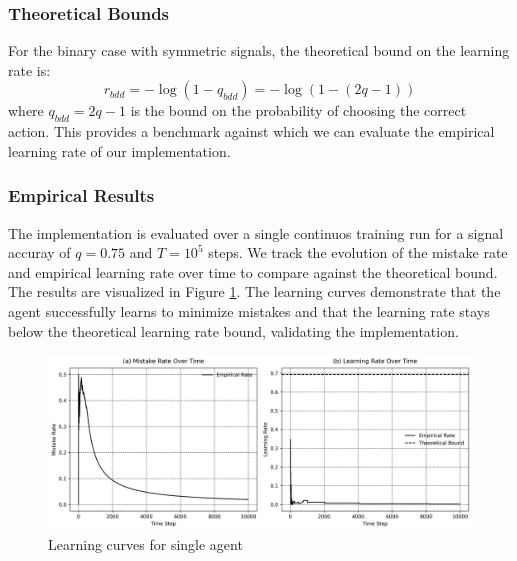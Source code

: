 \subsubsection*{Theoretical Bounds}
For the binary case with symmetric signals, the theoretical bound on the learning rate is:
\[
    r_{bdd} = -\log(1-q_{bdd}) = -\log(1-(2q-1))
\]
where $q_{bdd} = 2q-1$ is the bound on the probability of choosing the correct action. This provides a benchmark against which we can evaluate the empirical learning rate of our implementation.

\subsubsection*{Empirical Results}
The implementation is evaluated over a single continuos training run for a signal accuray of $q=0.75$ and $T=10^5$ steps. We track the evolution of the mistake rate and empirical learning rate over time to compare against the theoretical bound. The results are visualized in Figure \ref{fig:learning-curves}. The learning curves demonstrate that the agent successfully learns to minimize mistakes and that the learning rate stays below the theoretical learning rate bound, validating the implementation.

\begin{figure}[htbp]
    \centering
    \includegraphics[width=1\textwidth]{../charts/single_agent_learning_curves.png}
    \caption{Learning curves for single agent}
    \label{fig:learning-curves}
\end{figure}
